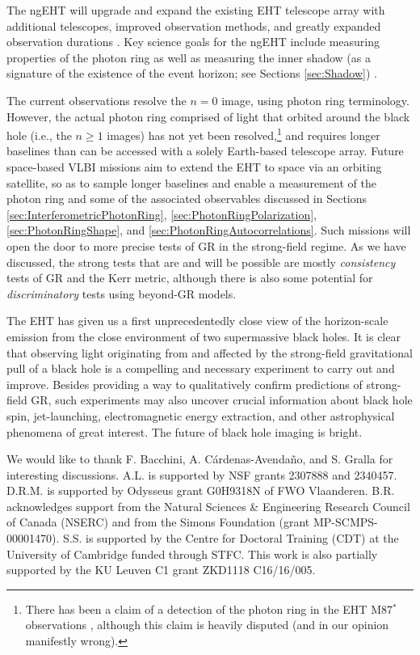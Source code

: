 \documentclass[graybox,envcountchap]{svmult}
\begin{document}
The ngEHT will upgrade and expand the existing EHT telescope array with additional telescopes, improved observation methods, and greatly expanded observation durations \cite{Johnson2023}.
Key science goals for the ngEHT include measuring properties of the photon ring as well as measuring the inner shadow (as a signature of the existence of the event horizon; see Sections \ref{sec:Shadow}) \cite{Ayzenberg2023}.

The current observations resolve the $n=0$ image, using photon ring terminology.
However, the actual photon ring comprised of light that orbited around the black hole (i.e., the $n\geq 1$ images) has not yet been resolved,\footnote{There has been a claim of a detection of the photon ring in the EHT M87$^*$ observations \cite{Broderick2022}, although this claim is heavily disputed \cite{LockhartGralla2022a,LockhartGralla2022b,Tiede2022} (and in our opinion manifestly wrong).} and requires longer baselines than can be accessed with a solely Earth-based telescope array.
Future space-based VLBI missions \cite{Gurvits2022,Kurczynski2022} aim to extend the EHT to space via an orbiting satellite, so as to sample longer baselines and enable a measurement of the photon ring and some of the associated observables discussed in Sections \ref{sec:InterferometricPhotonRing}, \ref{sec:PhotonRingPolarization}, \ref{sec:PhotonRingShape}, and \ref{sec:PhotonRingAutocorrelations}.
Such missions will open the door to more precise tests of GR in the strong-field regime.
As we have discussed, the strong tests that are and will be possible are mostly \emph{consistency} tests of GR and the Kerr metric, although there is also some potential for \emph{discriminatory} tests using beyond-GR models.

The EHT has given us a first unprecedentedly close view of the horizon-scale emission from the close environment of two supermassive black holes.
It is clear that observing light originating from and affected by the strong-field gravitational pull of a black hole is a compelling and necessary experiment to carry out and improve.
Besides providing a way to qualitatively confirm predictions of strong-field GR, such experiments may also uncover crucial information about black hole spin, jet-launching, electromagnetic energy extraction, and other astrophysical phenomena of great interest.
The future of black hole imaging is bright.

\begin{acknowledgement}
We would like to thank F. Bacchini, A. C\'ardenas-Avenda\~no, and S. Gralla for interesting discussions.
%
A.L. is supported by NSF grants 2307888 and 2340457.
%
D.R.M. is supported by Odysseus grant G0H9318N of FWO Vlaanderen.
%
B.R. acknowledges support from the Natural Sciences \& Engineering Research Council of Canada (NSERC) and from the Simons Foundation (grant MP-SCMPS-00001470).
%
S.S. is supported by the Centre for Doctoral Training (CDT) at the University of Cambridge funded through STFC.
%
This work is also partially supported by the KU Leuven C1 grant ZKD1118 C16/16/005.
\end{acknowledgement}
\end{document}
